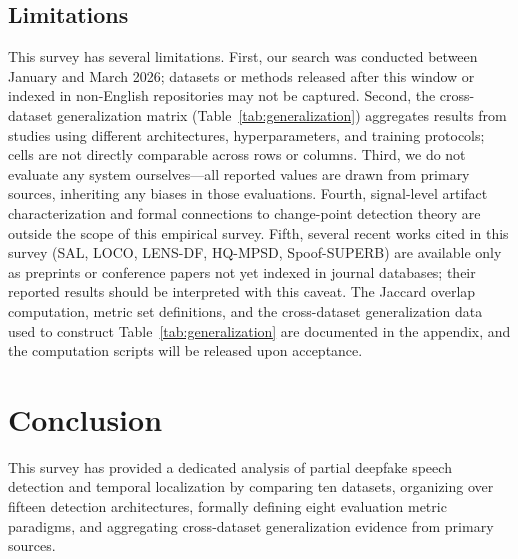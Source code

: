 \documentclass[journal]{IEEEtran}
\begin{document}
\subsection{Limitations}

This survey has several limitations. First, our search was conducted between January and March 2026; datasets or methods released after this window or indexed in non-English repositories may not be captured. Second, the cross-dataset generalization matrix (Table~\ref{tab:generalization}) aggregates results from studies using different architectures, hyperparameters, and training protocols; cells are not directly comparable across rows or columns. Third, we do not evaluate any system ourselves---all reported values are drawn from primary sources, inheriting any biases in those evaluations. Fourth, signal-level artifact characterization and formal connections to change-point detection theory are outside the scope of this empirical survey. Fifth, several recent works cited in this survey (SAL, LOCO, LENS-DF, HQ-MPSD, Spoof-SUPERB) are available only as preprints or conference papers not yet indexed in journal databases; their reported results should be interpreted with this caveat. The Jaccard overlap computation, metric set definitions, and the cross-dataset generalization data used to construct Table~\ref{tab:generalization} are documented in the appendix, and the computation scripts will be released upon acceptance.

\section{Conclusion}
\label{sec:conclusion}

This survey has provided a dedicated analysis of partial deepfake speech detection and temporal localization by comparing ten datasets, organizing over fifteen detection architectures, formally defining eight evaluation metric paradigms, and aggregating cross-dataset generalization evidence from primary sources.
\end{document}
